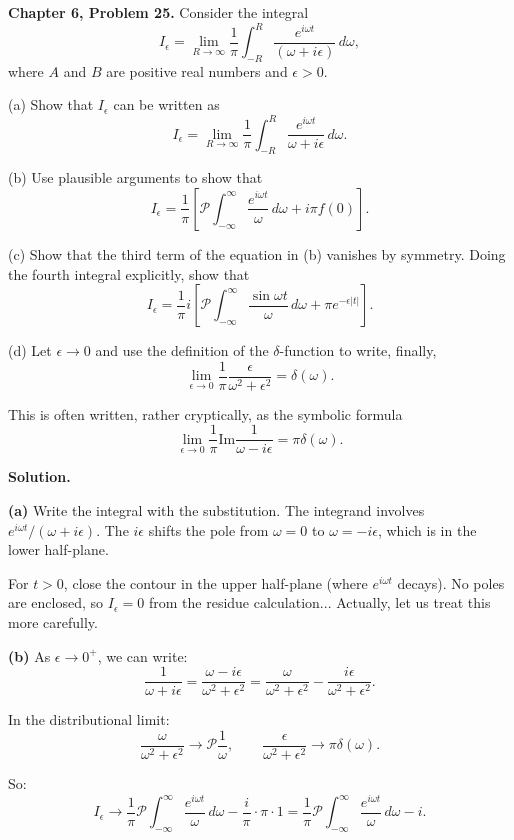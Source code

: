 \documentclass[12pt]{article}
\begin{document}
\textbf{Chapter 6, Problem 25.} Consider the integral
\[
I_\epsilon = \lim_{R\to\infty}\frac{1}{\pi}\int_{-R}^{R}\frac{e^{i\omega t}}{(\omega+i\epsilon)}\,d\omega,
\]
where $A$ and $B$ are positive real numbers and $\epsilon > 0$.

(a) Show that $I_\epsilon$ can be written as
\[
I_\epsilon = \lim_{R\to\infty}\frac{1}{\pi}\int_{-R}^{R}\frac{e^{i\omega t}}{\omega + i\epsilon}\,d\omega.
\]

(b) Use plausible arguments to show that
\[
I_\epsilon = \frac{1}{\pi}\left[\mathcal{P}\int_{-\infty}^{\infty}\frac{e^{i\omega t}}{\omega}\,d\omega + i\pi f(0)\right].
\]

(c) Show that the third term of the equation in (b) vanishes by symmetry. Doing the fourth integral explicitly, show that
\[
I_\epsilon = \frac{1}{\pi}i\left[\mathcal{P}\int_{-\infty}^{\infty}\frac{\sin\omega t}{\omega}\,d\omega + \pi e^{-\epsilon|t|}\right].
\]

(d) Let $\epsilon \to 0$ and use the definition of the $\delta$-function to write, finally,
\[
\lim_{\epsilon\to 0}\frac{1}{\pi}\frac{\epsilon}{\omega^2+\epsilon^2} = \delta(\omega).
\]

This is often written, rather cryptically, as the symbolic formula
\[
\lim_{\epsilon\to 0}\frac{1}{\pi}\text{Im}\frac{1}{\omega - i\epsilon} = \pi\delta(\omega).
\]

\bigskip
\textbf{Solution.}

\textbf{(a)} Write the integral with the substitution. The integrand involves $e^{i\omega t}/(\omega + i\epsilon)$. The $i\epsilon$ shifts the pole from $\omega = 0$ to $\omega = -i\epsilon$, which is in the lower half-plane.

For $t > 0$, close the contour in the upper half-plane (where $e^{i\omega t}$ decays). No poles are enclosed, so $I_\epsilon = 0$ from the residue calculation... Actually, let us treat this more carefully.

\textbf{(b)} As $\epsilon \to 0^+$, we can write:
\[
\frac{1}{\omega + i\epsilon} = \frac{\omega - i\epsilon}{\omega^2 + \epsilon^2} = \frac{\omega}{\omega^2+\epsilon^2} - \frac{i\epsilon}{\omega^2+\epsilon^2}.
\]

In the distributional limit:
\[
\frac{\omega}{\omega^2+\epsilon^2} \to \mathcal{P}\frac{1}{\omega}, \qquad \frac{\epsilon}{\omega^2+\epsilon^2} \to \pi\delta(\omega).
\]

So:
\[
I_\epsilon \to \frac{1}{\pi}\mathcal{P}\int_{-\infty}^{\infty}\frac{e^{i\omega t}}{\omega}\,d\omega - \frac{i}{\pi}\cdot\pi\cdot 1 = \frac{1}{\pi}\mathcal{P}\int_{-\infty}^{\infty}\frac{e^{i\omega t}}{\omega}\,d\omega - i.
\]
\end{document}
